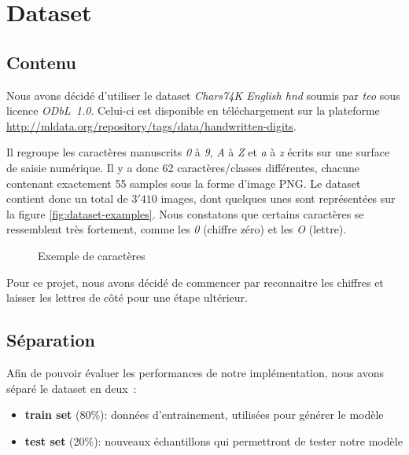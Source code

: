 
\chapter{Dataset}

\section{Contenu}

Nous avons décidé d'utiliser le dataset \emph{Chars74K English hnd} soumis par \emph{teo} sous licence \emph{ODbL~1.0}. Celui-ci est disponible en téléchargement sur la plateforme \url{http://mldata.org/repository/tags/data/handwritten-digits}.

Il regroupe les caractères manuscrits \emph{0} à \emph{9}, \emph{A} à \emph{Z} et \emph{a} à \emph{z} écrits sur une surface de saisie numérique. Il y a donc 62 caractères/classes différentes, chacune contenant exactement 55 samples sous la forme d'image PNG. Le dataset contient donc un total de $3'410$ images, dont quelques unes sont représentées sur la figure \vref{fig:dataset-examples}. Nous constatons que certains caractères se ressemblent très fortement, comme les \emph{0} (chiffre zéro) et les \emph{O} (lettre).

\begin{figure}[h]
\caption{Exemple de caractères}
\label{fig:dataset-examples}
\end{figure}

Pour ce projet, nous avons décidé de commencer par reconnaitre les chiffres et laisser les lettres de côté pour une étape ultérieur.


\section{Séparation}

Afin de pouvoir évaluer les performances de notre implémentation, nous avons séparé le dataset en deux~:
\begin{itemize}
\item \textbf{train set} (80\%): données d'entrainement, utilisées pour générer le modèle
\item \textbf{test set} (20\%): nouveaux échantillons qui permettront de tester notre modèle
\end{itemize} 